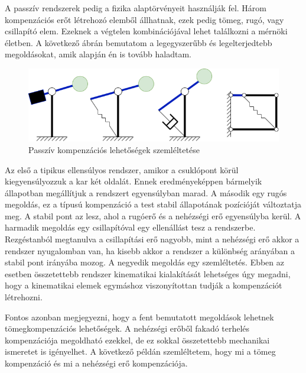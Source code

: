 A passzív rendszerek pedig a fizika alaptörvényeit használják fel. Három kompenzációs erőt létrehozó elemből állhatnak, ezek pedig tömeg, rugó, vagy csillapító elem. Ezeknek a végtelen kombinációjával lehet találkozni a mérnöki életben. A következő ábrán bemutatom a legegyszerűbb és legelterjedtebb megoldásokat, amik alapján én is tovább haladtam.\cite{gravkomp}

\begin{figure}[!ht]
\centering
\includegraphics[width=125mm, keepaspectratio]{figures/Diagrammok/Kompenzacios_lehetosegek_passziv}
\caption{Passzív kompenzációs lehetőségek szemléltetése}
\label{fig:Kompenzacios_lehetosegek_passziv}
\end{figure}

Az első a tipikus ellensúlyos rendszer, amikor a csuklópont körül kiegyensúlyozzuk a kar két oldalát. Ennek eredményeképpen bármelyik állapotban megállítjuk a rendszert egyensúlyban marad. A második egy rugós megoldás, ez a típusú kompenzáció a test stabil állapotának pozícióját változtatja meg. A stabil pont az lesz, ahol a rugóerő és a nehézségi erő egyensúlyba kerül. A harmadik megoldás egy csillapítóval egy ellenállást tesz a rendszerbe. Rezgéstanból megtanulva a csillapítási erő nagyobb, mint a nehézségi erő akkor a rendszer nyugalomban van, ha kisebb akkor a rendszer a különbség arányában a stabil pont irányába mozog. A negyedik megoldás egy szemléltetés. Ebben az esetben összetettebb rendszer kinematikai kialakítását lehetséges úgy megadni, hogy a kinematikai elemek egymáshoz viszonyítottan tudják a kompenzációt létrehozni.\cite{gravkomp}

Fontos azonban megjegyezni, hogy a fent bemutatott megoldások lehetnek tömegkompenzációs lehetőségek. A nehézségi erőből fakadó terhelés kompenzációja megoldható ezekkel, de ez sokkal összetettebb mechanikai ismeretet is igényelhet. A következő példán szemléltetem, hogy mi a tömeg kompenzáció és mi a nehézségi erő kompenzációja.\cite{vezetekellen}

